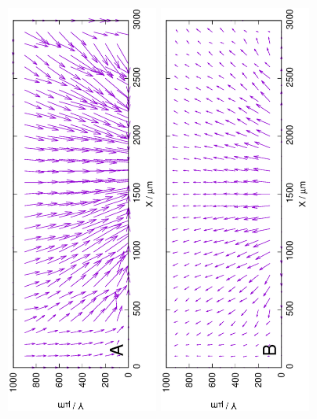 \begin{figure}
\centering
\includegraphics[width=0.35\textwidth, angle=-90]{img/mérések/Fe1_v.eps}
\includegraphics[width=0.35\textwidth, angle=-90]{img/mérések/Zn1_v.eps}

\end{figure}
